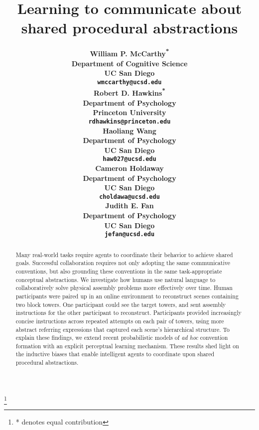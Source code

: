 \documentclass[10pt,letterpaper]{article}
\title{Learning to communicate about shared procedural abstractions}
\author{
  \large \bf William P. McCarthy\textsuperscript{*}\\
  Department of Cognitive Science\\
  UC San Diego\\
  \texttt{wmccarthy@ucsd.edu} \\
  \And
  \large \bf Robert D. Hawkins\textsuperscript{*}\\
  Department of Psychology\\
  Princeton University\\
  \texttt{rdhawkins@princeton.edu} \\
  \And
  \large \bf Haoliang Wang\\
  Department of Psychology\\
  UC San Diego\\
  \texttt{haw027@ucsd.edu} \\
  \AND
  \large \bf Cameron Holdaway\\
  Department of Psychology\\
  UC San Diego\\
  \texttt{choldawa@ucsd.edu} \\
  \And
  \large \bf Judith E. Fan\\
  Department of Psychology\\
  UC San Diego\\
  \texttt{jefan@ucsd.edu} \\
}
\begin{document}
\maketitle

\begin{abstract}

Many real-world tasks require agents to coordinate their behavior to achieve shared goals.
Successful collaboration requires not only adopting the same communicative conventions, but also grounding these conventions in the same task-appropriate conceptual abstractions. 
We investigate how humans use natural language to collaboratively solve physical assembly problems more effectively over time.
Human participants were paired up in an online environment to reconstruct scenes containing two block towers. 
One participant could see the target towers, and sent assembly instructions for the other participant to reconstruct.
Participants provided increasingly concise instructions across repeated attempts on each pair of towers, using more abstract referring expressions that captured each scene's hierarchical structure.
To explain these findings, we extend recent probabilistic models of \emph{ad hoc} convention formation with an explicit perceptual learning mechanism. 
These results shed light on the inductive biases that enable intelligent agents to coordinate upon shared procedural abstractions.

\end{abstract}
\let\thefootnote\relax\footnote{* denotes equal contribution}
\end{document}
